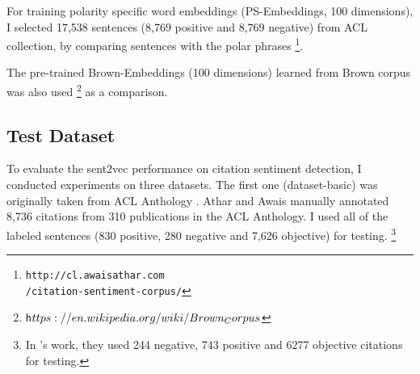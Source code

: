 \documentclass[11pt]{llncs}
\begin{document}
 

For training polarity specific word embeddings (PS-Embeddings, 100 dimensions), I selected 17,538 sentences (8,769 positive and 8,769 negative) from ACL collection, by comparing sentences with the polar phrases \footnote{\footnotesize{\tt http://cl.awaisathar.com\\/citation-sentiment-corpus/}}.

The pre-trained Brown-Embeddings (100 dimensions) learned from Brown corpus was also used \footnote{\footnotesize{\tt h$ttps://en.wikipedia.org/wiki/\\Brown_Corpus$}} as a comparison.


\subsection{Test Dataset}\label{sec:testdataset}

To evaluate the sent2vec performance on citation sentiment detection, I conducted experiments on three datasets. The first one (dataset-basic) was originally taken from ACL Anthology \cite{bird2008acl}. Athar and Awais \cite{athar2011sentiment} manually annotated 8,736 citations from 310 publications in the ACL Anthology. I used all of the labeled sentences (830 positive, 280 negative and 7,626 objective) for testing. %
\footnote{\footnotesize{In \cite{athar2011sentiment}'s work, they used 244 negative, 743 positive and 6277 objective citations for testing.}}
\end{document}
